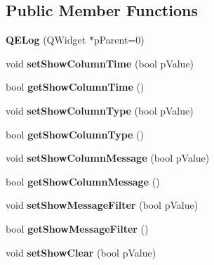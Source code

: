 \subsection*{Public Member Functions}
\begin{DoxyCompactItemize}
\item 
\hypertarget{classQELog_ab8dfcf853cd616c4b3ff0871d0a9fed2}{
{\bfseries QELog} (QWidget $\ast$pParent=0)}
\label{classQELog_ab8dfcf853cd616c4b3ff0871d0a9fed2}

\item 
\hypertarget{classQELog_a44b59d902bf4a224a6f3b17f44c5d1ee}{
void {\bfseries setShowColumnTime} (bool pValue)}
\label{classQELog_a44b59d902bf4a224a6f3b17f44c5d1ee}

\item 
\hypertarget{classQELog_a101275b6828073b8549d5afbd6fde0f4}{
bool {\bfseries getShowColumnTime} ()}
\label{classQELog_a101275b6828073b8549d5afbd6fde0f4}

\item 
\hypertarget{classQELog_a863a48002251e5ffd14fdda865999880}{
void {\bfseries setShowColumnType} (bool pValue)}
\label{classQELog_a863a48002251e5ffd14fdda865999880}

\item 
\hypertarget{classQELog_aca7fdc600f38febe8d3981dca10bdfbe}{
bool {\bfseries getShowColumnType} ()}
\label{classQELog_aca7fdc600f38febe8d3981dca10bdfbe}

\item 
\hypertarget{classQELog_a72b6bac93761df396df2182035cea478}{
void {\bfseries setShowColumnMessage} (bool pValue)}
\label{classQELog_a72b6bac93761df396df2182035cea478}

\item 
\hypertarget{classQELog_ad4d869b164c31296834be96704a856e2}{
bool {\bfseries getShowColumnMessage} ()}
\label{classQELog_ad4d869b164c31296834be96704a856e2}

\item 
\hypertarget{classQELog_abd19f741eed9698ecfec6fe974591dc4}{
void {\bfseries setShowMessageFilter} (bool pValue)}
\label{classQELog_abd19f741eed9698ecfec6fe974591dc4}

\item 
\hypertarget{classQELog_a02b535f7c8cc3852eb507fb0f693e532}{
bool {\bfseries getShowMessageFilter} ()}
\label{classQELog_a02b535f7c8cc3852eb507fb0f693e532}

\item 
\hypertarget{classQELog_a0db8ebcef66219fced74de0c68f00216}{
void {\bfseries setShowClear} (bool pValue)}
\label{classQELog_a0db8ebcef66219fced74de0c68f00216}


\end{DoxyCompactItemize}
